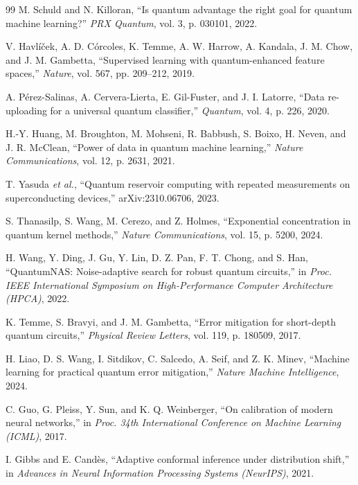 \documentclass[10pt,conference]{IEEEtran}
\begin{document}
\begin{thebibliography}{99}
M. Schuld and N. Killoran, ``Is quantum advantage the right goal for quantum machine learning?''
\emph{PRX Quantum}, vol. 3, p. 030101, 2022.

V. Havl\'i\v{c}ek, A. D. C\'orcoles, K. Temme, A. W. Harrow, A. Kandala, J. M. Chow, and
J. M. Gambetta, ``Supervised learning with quantum-enhanced feature spaces,'' \emph{Nature},
vol. 567, pp. 209--212, 2019.

A. P\'erez-Salinas, A. Cervera-Lierta, E. Gil-Fuster, and J. I. Latorre, ``Data re-uploading for a
universal quantum classifier,'' \emph{Quantum}, vol. 4, p. 226, 2020.

H.-Y. Huang, M. Broughton, M. Mohseni, R. Babbush, S. Boixo, H. Neven, and J. R. McClean, ``Power
of data in quantum machine learning,'' \emph{Nature Communications}, vol. 12, p. 2631, 2021.

T. Yasuda \emph{et al.}, ``Quantum reservoir computing with repeated measurements on
superconducting devices,'' arXiv:2310.06706, 2023.

S. Thanasilp, S. Wang, M. Cerezo, and Z. Holmes, ``Exponential concentration in quantum kernel
methods,'' \emph{Nature Communications}, vol. 15, p. 5200, 2024.

H. Wang, Y. Ding, J. Gu, Y. Lin, D. Z. Pan, F. T. Chong, and S. Han, ``QuantumNAS: Noise-adaptive
search for robust quantum circuits,'' in \emph{Proc. IEEE International Symposium on
High-Performance Computer Architecture (HPCA)}, 2022.

K. Temme, S. Bravyi, and J. M. Gambetta, ``Error mitigation for short-depth quantum circuits,''
\emph{Physical Review Letters}, vol. 119, p. 180509, 2017.

H. Liao, D. S. Wang, I. Sitdikov, C. Salcedo, A. Seif, and Z. K. Minev, ``Machine learning for
practical quantum error mitigation,'' \emph{Nature Machine Intelligence}, 2024.

C. Guo, G. Pleiss, Y. Sun, and K. Q. Weinberger, ``On calibration of modern neural networks,'' in
\emph{Proc. 34th International Conference on Machine Learning (ICML)}, 2017.

I. Gibbs and E. Cand\`es, ``Adaptive conformal inference under distribution shift,'' in
\emph{Advances in Neural Information Processing Systems (NeurIPS)}, 2021.


\end{thebibliography}
\end{document}
